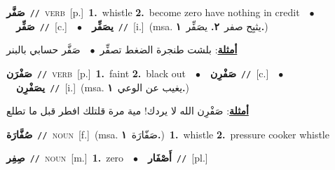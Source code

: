 \documentclass[10pt,a4paper,twoside]{article} %
\begin{document}
\begin{multicols}{2}
{\setlength\topsep{0pt}\textbf{\foreignlanguage{arabic}{صَفَّر}}\ {\color{gray}\texttt{//}\color{black}}\ \textsc{verb}\ [p.]\ \textbf{1.}~whistle  \textbf{2.}~become zero have nothing in credit\ \ $\bullet$\ \ \setlength\topsep{0pt}\textbf{\foreignlanguage{arabic}{صَفِّر}}\ {\color{gray}\texttt{//}\color{black}}\ [c.]\ \ $\bullet$\ \ \setlength\topsep{0pt}\textbf{\foreignlanguage{arabic}{يصَفِّر}}\ {\color{gray}\texttt{//}\color{black}}\ [i.]\ \color{gray}(msa. \foreignlanguage{arabic}{يثبِح صفر}~\foreignlanguage{arabic}{\textbf{٢.}}  \foreignlanguage{arabic}{يصَفِّر}~\foreignlanguage{arabic}{\textbf{١.}})\color{black}\  \begin{flushright}\color{gray}\foreignlanguage{arabic}{\textbf{\underline{\foreignlanguage{arabic}{أمثلة}}}: بلشت طنجرة الضغط تصفِّر\ $\bullet$\ \  صَفَّر حسابي بالبنر}\end{flushright}\color{black}} \vspace{2mm}

{\setlength\topsep{0pt}\textbf{\foreignlanguage{arabic}{صَفْرَن}}\ {\color{gray}\texttt{//}\color{black}}\ \textsc{verb}\ [p.]\ \textbf{1.}~faint  \textbf{2.}~black out\ \ $\bullet$\ \ \setlength\topsep{0pt}\textbf{\foreignlanguage{arabic}{صَفْرِن}}\ {\color{gray}\texttt{//}\color{black}}\ [c.]\ \ $\bullet$\ \ \setlength\topsep{0pt}\textbf{\foreignlanguage{arabic}{يصَفْرِن}}\ {\color{gray}\texttt{//}\color{black}}\ [i.]\ \color{gray}(msa. \foreignlanguage{arabic}{يغيب عن الوعي}~\foreignlanguage{arabic}{\textbf{١.}})\color{black}\  \begin{flushright}\color{gray}\foreignlanguage{arabic}{\textbf{\underline{\foreignlanguage{arabic}{أمثلة}}}: صَفْرِن الله لا يردك! مية مرة قلتلك افطر قبل ما تطلع}\end{flushright}\color{black}} \vspace{2mm}

{\setlength\topsep{0pt}\textbf{\foreignlanguage{arabic}{صُفَّارَة}}\ {\color{gray}\texttt{//}\color{black}}\ \textsc{noun}\ [f.]\ \color{gray}(msa. \foreignlanguage{arabic}{صَفّارَة}~\foreignlanguage{arabic}{\textbf{١.}})\color{black}\ \textbf{1.}~whistle  \textbf{2.}~pressure cooker whistle\ } \vspace{2mm}

{\setlength\topsep{0pt}\textbf{\foreignlanguage{arabic}{صِفِر}}\ {\color{gray}\texttt{//}\color{black}}\ \textsc{noun}\ [m.]\ \textbf{1.}~zero\ \ $\bullet$\ \ \setlength\topsep{0pt}\textbf{\foreignlanguage{arabic}{أَصْفَار}}\ {\color{gray}\texttt{//}\color{black}}\ [pl.]\ } \vspace{2mm}


\end{multicols}
\end{document}

